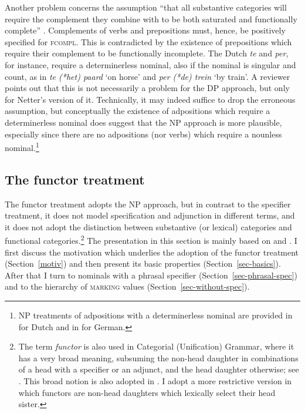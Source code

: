 \documentclass[output=paper
	        ,collection
	        ,collectionchapter
 	        ,biblatex
                ,babelshorthands
                ,newtxmath
                ,draftmode
                ,colorlinks, citecolor=brown
]{langscibook}
\begin{document}
Another problem concerns the assumption ``that all substantive categories will 
require the complement they combine with to be both saturated and functionally complete''
\citep[311]{Netter94}. Complements of verbs and prepositions must, hence, be positively 
specified for \textsc{fcompl}. This is contradicted by the existence of
prepositions which require their complement to be functionally incomplete. 
The Dutch \emph{te} and \emph{per}, for instance, require a determinerless nominal,
also if the nominal is singular and count, as in \emph{te (*het) paard} `on horse' 
and \emph{per (*de) trein} `by train'. A reviewer points out that this is 
not necessarily a problem for the DP approach, but only for Netter's version of it. 
Technically, it may indeed suffice to drop the erroneous assumption, but 
conceptually the existence of adpositions which require a determinerless nominal 
does suggest that the NP approach is more plausible, especially since 
there are no adpositions (nor verbs) which require a nounless nominal.\footnote{NP 
treatments of adpositions with a determinerless nominal are provided in 
\citet{VanEynde04} for Dutch and in \citet{Kiss2008a-u} for German.}    


\subsection{The functor treatment} 
\label{funct}


The functor treatment adopts the NP approach, but in contrast to the specifier treatment,  
it does not model specification and adjunction in different terms, and it does not adopt 
the distinction between substantive (or lexical) categories and functional 
categories.\footnote{The term \emph{functor} is also used in Categorial (Unification) Grammar, 
where it has a very broad meaning, subsuming the non-head daughter in combinations of a 
head with a specifier or an adjunct, and the head daughter otherwise;
see \citet{Bouma88}. This broad notion is also adopted in 
\citet{Reape94}. I adopt a more restrictive version in which functors 
are non-head daughters which lexically select their head sister.}  
The presentation in this section is mainly based on \citet{VanEynde06} 
and \citet{Allegranza06}. I first discuss the motivation which underlies the adoption 
of the functor treatment (Section~\ref{motiv}) and then present its basic
properties (Section~\ref{sec-basics}). After that I turn to nominals with a 
phrasal specifier (Section~\ref{sec-phrasal-spec}) 
and to the hierarchy of \textsc{marking} values (Section~\ref{sec-without-spec}).    
\end{document}
